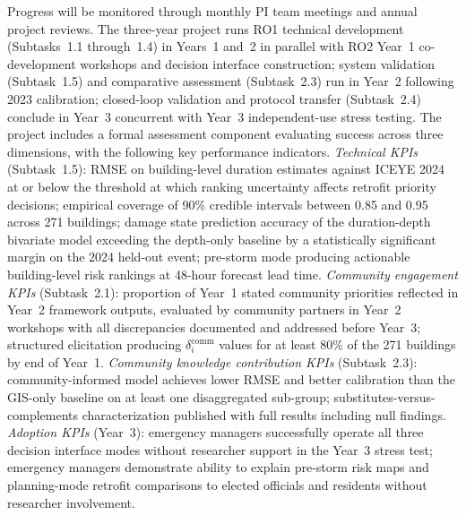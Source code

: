 \documentclass[11pt]{article}
\begin{document}
Progress will be monitored through monthly PI team meetings and annual project
reviews.
The three-year project runs RO1 technical development (Subtasks~1.1 through~1.4)
in Years~1 and~2 in parallel with RO2 Year~1 co-development workshops and
decision interface construction; system validation (Subtask~1.5) and comparative
assessment (Subtask~2.3) run in Year~2 following 2023 calibration; closed-loop
validation and protocol transfer (Subtask~2.4) conclude in Year~3 concurrent with
Year~3 independent-use stress testing.
The project includes a formal assessment component evaluating success across three
dimensions, with the following key performance indicators.
\textit{Technical KPIs} (Subtask~1.5): RMSE on building-level duration estimates
against ICEYE 2024 at or below the threshold at which ranking uncertainty affects
retrofit priority decisions; empirical coverage of 90\% credible intervals between
0.85 and 0.95 across 271 buildings; damage state prediction accuracy of the
duration-depth bivariate model exceeding the depth-only baseline by a statistically
significant margin on the 2024 held-out event; pre-storm mode producing actionable
building-level risk rankings at 48-hour forecast lead time.
\textit{Community engagement KPIs} (Subtask~2.1): proportion of Year~1 stated
community priorities reflected in Year~2 framework outputs, evaluated by community
partners in Year~2 workshops with all discrepancies documented and addressed before
Year~3; structured elicitation producing $\delta_i^{\mathrm{comm}}$ values for
at least 80\% of the 271 buildings by end of Year~1.
\textit{Community knowledge contribution KPIs} (Subtask~2.3): community-informed
model achieves lower RMSE and better calibration than the GIS-only baseline on at
least one disaggregated sub-group; substitutes-versus-complements characterization
published with full results including null findings.
\textit{Adoption KPIs} (Year~3): emergency managers successfully operate all three
decision interface modes without researcher support in the Year~3 stress test;
emergency managers demonstrate ability to explain pre-storm risk maps and
planning-mode retrofit comparisons to elected officials and residents without
researcher involvement.

\end{document}
